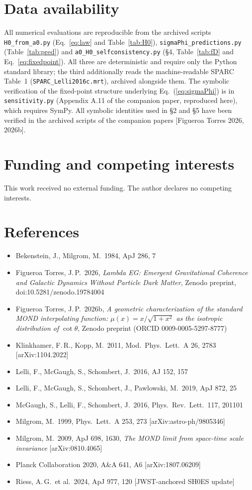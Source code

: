 \documentclass[11pt,a4paper]{article}
\begin{document}
\section*{Data availability}

All numerical evaluations are reproducible from the archived scripts
{\tt H0\_from\_a0.py} (Eq.~\ref{eq:law} and Table~\ref{tab:H0}),
{\tt sigmaPhi\_predictions.py} (Table~\ref{tab:pred}) and
{\tt a0\_H0\_selfconsistency.py} (\S4, Table~\ref{tab:fD} and
Eq.~\ref{eq:fixedpoint}). All three are deterministic and require only the
Python standard library; the third additionally reads the machine-readable
SPARC Table~1 ({\tt SPARC\_Lelli2016c.mrt}), archived alongside them. The
symbolic verification of the fixed-point structure underlying
Eq.~(\ref{eq:sigmaPhi}) is in {\tt sensitivity.py} (Appendix A.11 of the
companion paper, reproduced here), which requires SymPy. All symbolic
identities used in \S2 and \S5 have been verified in the archived scripts of
the companion papers [Figueroa Torres 2026, 2026b].

\section*{Funding and competing interests}

This work received no external funding. The author declares no competing
interests.

\section*{References}

\begin{itemize}\itemsep2pt
\item Bekenstein, J., Milgrom, M.\ 1984, ApJ 286, 7
\item Figueroa Torres, J.\,P.\ 2026, \emph{Lambda EG: Emergent Gravitational
  Coherence and Galactic Dynamics Without Particle Dark Matter}, Zenodo
  preprint, doi:10.5281/zenodo.19784004
\item Figueroa Torres, J.\,P.\ 2026b, \emph{A geometric characterization of
  the standard MOND interpolating function: $\mu(x) = x/\sqrt{1+x^2}$ as
  the isotropic distribution of $\cot\theta$}, Zenodo preprint (ORCID
  0009-0005-5297-8777)
\item Klinkhamer, F.\,R., Kopp, M.\ 2011, Mod.\ Phys.\ Lett.\ A 26, 2783
  [arXiv:1104.2022]
\item Lelli, F., McGaugh, S., Schombert, J.\ 2016, AJ 152, 157
\item Lelli, F., McGaugh, S., Schombert, J., Pawlowski, M.\ 2019, ApJ 872, 25
\item McGaugh, S., Lelli, F., Schombert, J.\ 2016, Phys.\ Rev.\ Lett.\ 117,
  201101
\item Milgrom, M.\ 1999, Phys.\ Lett.\ A 253, 273 [arXiv:astro-ph/9805346]
\item Milgrom, M.\ 2009, ApJ 698, 1630, \emph{The MOND limit from space-time
  scale invariance} [arXiv:0810.4065]
\item Planck Collaboration 2020, A\&A 641, A6 [arXiv:1807.06209]
\item Riess, A.\,G.\ et al.\ 2024, ApJ 977, 120 [JWST-anchored SH0ES update]
\end{itemize}
\end{document}
